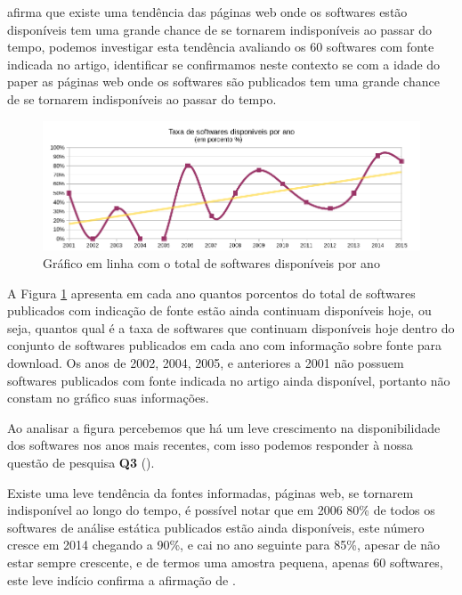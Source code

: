  afirma que existe uma tendência das páginas
web onde os softwares estão disponíveis tem uma grande chance de se tornarem
indisponíveis ao passar do tempo, podemos investigar esta tendência 
avaliando os 60 softwares com fonte indicada no artigo,
identificar se confirmamos neste contexto se com a idade do paper
as páginas web onde os softwares são publicados tem uma grande chance de se
tornarem indisponíveis ao passar do tempo.

\begin{figure}[h]
  \center
  \includegraphics[scale=0.65]{imagens/softwares-disponivel-por-ano.png}
  \caption{Gráfico em linha com o total de softwares disponíveis por ano}
  \label{softwares-disponivel-por-ano}
\end{figure}

A Figura \ref{softwares-disponivel-por-ano} apresenta em cada ano quantos
porcentos do total de softwares publicados com indicação de fonte estão ainda continuam
disponíveis hoje, ou seja, quantos qual é a taxa de softwares que continuam
disponíveis hoje dentro do conjunto de softwares publicados em cada ano com
informação sobre fonte para download.  Os anos de 2002, 2004, 2005, e
anteriores a 2001 não possuem softwares publicados com fonte indicada no artigo
ainda disponível, portanto não constam no gráfico suas informações.

Ao analisar a figura percebemos que há um leve crescimento na disponibilidade
dos softwares nos anos mais recentes, com isso podemos responder à nossa
questão de pesquisa {\bf Q3} (\QuestaoTres).

Existe uma leve tendência da fontes informadas, páginas web, se tornarem
indisponível ao longo do tempo, é possível notar que em 2006 80\% de todos os
softwares de análise estática publicados estão ainda disponíveis, este número
cresce em 2014 chegando a 90\%, e cai no ano seguinte para 85\%, apesar de não
estar sempre crescente, e de termos uma amostra pequena, apenas 60 softwares,
este leve indício confirma a afirmação de .

